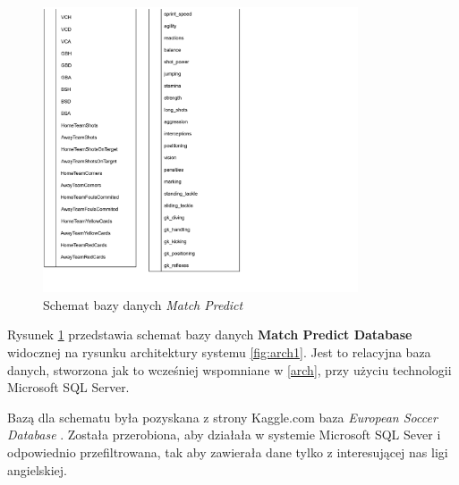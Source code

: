 \begin{figure}[h]
\ContinuedFloat
    \centering
  \includegraphics[width=0.83\textwidth]{figures/match_predict_schema_2.png}%
  \addtocounter{figure}{1}
  \caption{Schemat bazy danych \textit{Match Predict}}
    
  \label{fig:match_predict_schema}
    
\end{figure}
 
\noindent Rysunek \ref{fig:match_predict_schema} przedstawia schemat bazy danych \textbf{Match Predict Database} widocznej na rysunku architektury systemu \ref{fig:arch1}. Jest to relacyjna baza danych, stworzona jak to wcześniej wspomniane w \ref{arch}, przy użyciu technologii Microsoft SQL Server.

Bazą dla schematu była pozyskana z strony Kaggle.com baza \textit{European Soccer Database} \cite{kagggle_european_soccer_database}. Została przerobiona, aby działała w systemie Microsoft SQL Sever i odpowiednio przefiltrowana, tak aby zawierała dane tylko z interesującej nas ligi angielskiej.

